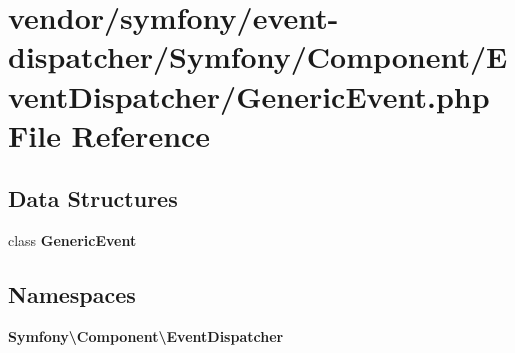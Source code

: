 \section{vendor/symfony/event-\/dispatcher/\+Symfony/\+Component/\+Event\+Dispatcher/\+Generic\+Event.php File Reference}
\label{_generic_event_8php}
\subsection*{Data Structures}
\begin{DoxyCompactItemize}
\item 
class {\bf Generic\+Event}
\end{DoxyCompactItemize}
\subsection*{Namespaces}
\begin{DoxyCompactItemize}
\item 
 {\bf Symfony\textbackslash{}\+Component\textbackslash{}\+Event\+Dispatcher}
\end{DoxyCompactItemize}
